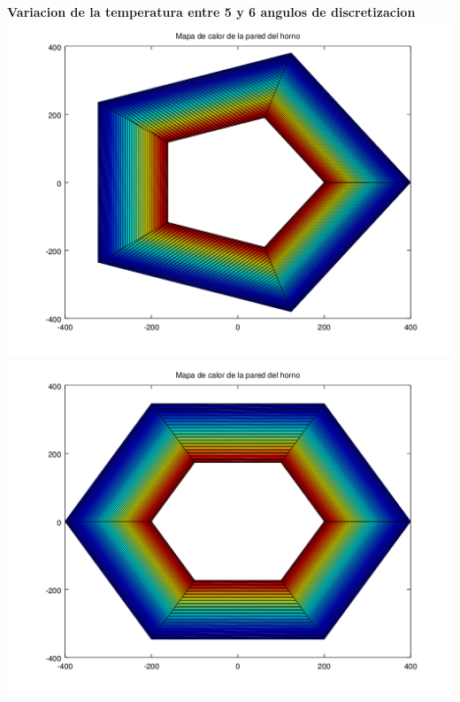 \begin{enumerate}
	  	\textbf{Variacion de la temperatura entre 5 y 6 angulos de discretizacion}\\
	  	\includegraphics[scale=0.35]{experimentos1a_1b/evolucion_posicion_isoterma_temperatura/variacion_angulos_radio_fijo_se_suaviza_isoterma/test10_050_radios_005_angulos_inst_001_heatmap.png}
		\includegraphics[scale=0.35]{experimentos1a_1b/evolucion_posicion_isoterma_temperatura/variacion_angulos_radio_fijo_se_suaviza_isoterma/test10_050_radios_006_angulos_inst_001_heatmap.png}	  	


\end{enumerate}
